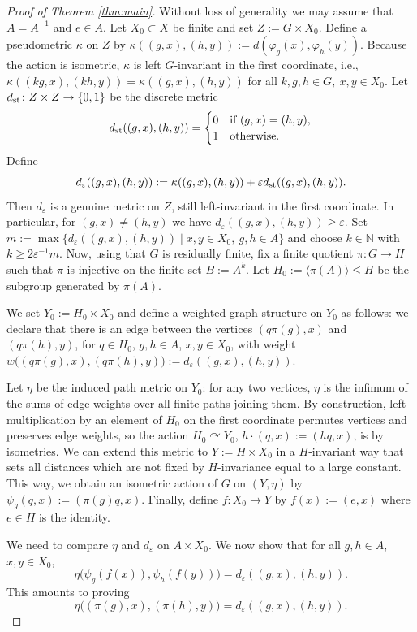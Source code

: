 \documentclass[11pt,a4paper]{amsproc}
\numberwithin{equation}{section}
\theoremstyle{definition}
\begin{document}
\begin{proof}[Proof of Theorem \ref{thm:main}]
Without loss of generality we may assume that $A=A^{-1}$ and $e \in A$.
Let $X_0\subset X$ be finite and set $Z:=G \times X_0.$
Define a pseudometric $\kappa$ on $Z$ by
$\kappa((g,x),(h,y)) := d(\varphi_g(x),\varphi_h(y)).$
Because the action is isometric, $\kappa$ is left $G$-invariant in the first coordinate, i.e.,
$\kappa((kg,x),(kh,y)) = \kappa((g,x),(h,y))$ for all $k,g,h\in G,\ x,y\in X_0$.
Let $d_{\rm st}\colon Z\times Z\to\{0,1\}$ be the discrete metric
\[
d_{\rm st}((g,x),(h,y)) =
\begin{cases}
0 &\text{if } (g,x)=(h,y),\\
1 &\text{otherwise.}
\end{cases}
\]
Define
\[
d_{\varepsilon}((g,x),(h,y)):=\kappa((g,x),(h,y)) + \varepsilon d_{\rm st}((g,x),(h,y)).
\]
Then $d_\varepsilon$ is a genuine metric on $Z$, still left-invariant in the first coordinate. In particular, for $(g,x)\neq(h,y)$ we have $d_\varepsilon((g,x),(h,y))\ge\varepsilon$.
Set $m:= \max \{d_{\varepsilon}((g,x),(h,y)) \mid x,y \in X_0,\ g,h \in A\}$
and choose $k\in \mathbb N$ with $k \geq 2\varepsilon^{-1}m.$
Now, using that $G$ is residually finite, fix a finite quotient
$ \pi\colon G\to H$
such that $\pi$ is injective on the finite set $B:=A^{k}$. Let $H_0:=\langle \pi(A)\rangle\le H$ be the subgroup generated by $\pi(A)$.

We set $Y_0:=H_0\times X_0$ and define a weighted graph structure on $Y_0$ as follows: we declare that there is an edge between the vertices
$(q\pi(g),x)$ and $(q\pi(h),y)$, for $q\in H_0$, $g,h\in A$, $x,y\in X_0$, with weight
$w\bigl((q\pi(g),x),(q\pi(h),y)\bigr)
:= d_\varepsilon((g,x),(h,y)).$

Let $\eta$ be the induced path metric on $Y_0$: for any two vertices, $\eta$ is the infimum of the sums of edge weights over all finite paths joining them. By construction, left multiplication by an element of $H_0$ on the first coordinate permutes vertices and preserves edge weights, so the action
$H_0\curvearrowright Y_0$, $h\cdot(q,x):=(hq,x)$,
is by isometries. We can extend this metric to $Y:=H \times X_0$ in a $H$-invariant way that sets all distances which are not fixed by $H$-invariance equal to a large constant. This way, 
we obtain an isometric action of  $G$ on $(Y,\eta)$ by
$\psi_g(q,x):=(\pi(g)q,x).$ Finally, define $f\colon X_0\to Y$ by $f(x):=(e,x)$ where $e\in H$ is the identity.

We need to compare $\eta$ and $d_\varepsilon$ on $A\times X_0$. We now show that for all $g,h\in A$, $x,y\in X_0$,
\begin{equation}\label{eq:eta-deps}
\eta\bigl(\psi_g(f(x)),\psi_h(f(y))\bigr)
= d_\varepsilon((g,x),(h,y)).
\end{equation}
This amounts to proving
\[
\eta\bigl((\pi(g),x),(\pi(h),y)\bigr) = d_\varepsilon((g,x),(h,y)).
\]


\end{proof}
\end{document}
